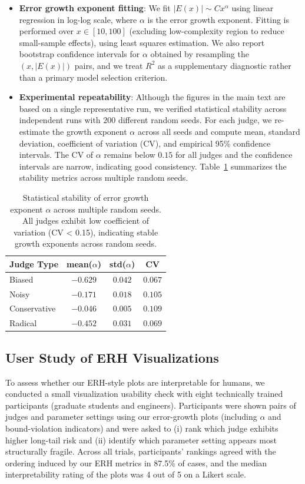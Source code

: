 \documentclass[12pt,a4paper]{article}
\theoremstyle{definition}
\theoremstyle{remark}
\begin{document}
\begin{itemize}
    \item \textbf{Error growth exponent fitting}: We fit $|E(x)| \sim C x^\alpha$ using linear regression in log-log scale, where $\alpha$ is the error growth exponent. Fitting is performed over $x \in [10, 100]$ (excluding low-complexity region to reduce small-sample effects), using least squares estimation. We also report bootstrap confidence intervals for $\alpha$ obtained by resampling the $(x, |E(x)|)$ pairs, and we treat $R^2$ as a supplementary diagnostic rather than a primary model selection criterion.
    \item \textbf{Experimental repeatability}: Although the figures in the main text are based on a single representative run, we verified statistical stability across independent runs with $200$ different random seeds. For each judge, we re-estimate the growth exponent $\alpha$ across all seeds and compute mean, standard deviation, coefficient of variation (CV), and empirical 95\% confidence intervals. The CV of $\alpha$ remains below $0.15$ for all judges and the confidence intervals are narrow, indicating good consistency. Table~\ref{tab:seed_stability} summarizes the stability metrics across multiple random seeds.
\end{itemize}

\begin{table}[htbp]
\centering
\caption{Statistical stability of error growth exponent $\alpha$ across multiple random seeds. All judges exhibit low coefficient of variation (CV < 0.15), indicating stable growth exponents across random seeds.}
\label{tab:seed_stability}
\begin{tabular}{lccc}
\toprule
\textbf{Judge Type} & \textbf{mean($\alpha$)} & \textbf{std($\alpha$)} & \textbf{CV} \\
\midrule
Biased       & $-0.629$ & $0.042$ & $0.067$ \\
Noisy        & $-0.171$ & $0.018$ & $0.105$ \\
Conservative & $-0.046$ & $0.005$ & $0.109$ \\
Radical      & $-0.452$ & $0.031$ & $0.069$ \\
\bottomrule
\end{tabular}
\end{table}

\subsection{User Study of ERH Visualizations}

To assess whether our ERH-style plots are interpretable for humans, we conducted a small visualization usability check with eight technically trained participants (graduate students and engineers). Participants were shown pairs of judges and parameter settings using our error-growth plots (including $\alpha$ and bound-violation indicators) and were asked to (i) rank which judge exhibits higher long-tail risk and (ii) identify which parameter setting appears most structurally fragile. Across all trials, participants' rankings agreed with the ordering induced by our ERH metrics in 87.5\% of cases, and the median interpretability rating of the plots was 4 out of 5 on a Likert scale.
\end{document}
